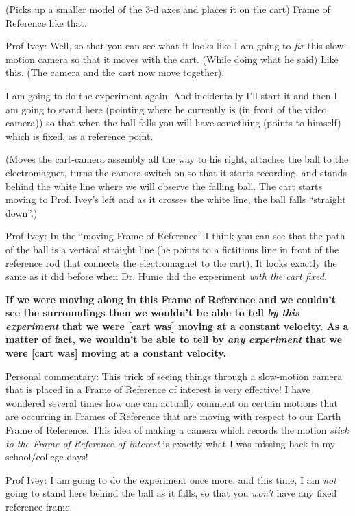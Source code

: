 \documentclass[a6paper]{article}
\begin{document}
(Picks up a smaller model of the 3-d axes and places it on the cart) Frame of Reference like that. 

Prof Ivey: Well, so that you can see what it looks like I am going to \emph{fix} this slow-motion camera so that it moves with the cart. (While doing what he said) Like this. (The camera and the cart now move together).

I am going to do the experiment again. And incidentally I'll start it and then I am going to stand here (pointing where he currently is (in front of the video camera)) so that when the ball falls you will have something (points to himself) which is fixed, as a reference point. 

(Moves the cart-camera assembly all the way to his right, attaches the ball to the electromagnet, turns the camera switch on so that it starts recording, and stands behind the white line where we will observe the falling ball. The cart starts moving to Prof. Ivey's left and as it crosses the white line, the ball falls ``straight down''.)

Prof Ivey: In the ``moving Frame of Reference'' I think you can see that the path of the ball is a vertical straight line (he points to a fictitious line in front of the reference rod that connects the electromagnet to the cart). It looks exactly the same as it did before when Dr. Hume did the experiment \emph{with the cart fixed}.

\textbf{If we were moving along in this Frame of Reference and we couldn't see the surroundings then we wouldn't be able to tell \emph{by this experiment} that we were [cart was] moving at a constant velocity. As a matter of fact, we wouldn't be able to tell by \emph{any experiment} that we were [cart was] moving at a constant velocity.}

Personal commentary: This trick of seeing things through a slow-motion camera that is placed in a Frame of Reference of interest is very effective! I have wondered several times how one can actually comment on certain motions that are occurring in Frames of Reference that are moving with respect to our Earth Frame of Reference. This idea of making a camera which records the motion \emph{stick to the Frame of Reference of interest} is exactly what I was missing back in my school/college days!

Prof Ivey: I am going to do the experiment once more, and this time, I am \emph{not} going to stand here behind the ball as it falls, so that you \emph{won't} have any fixed reference frame.
\end{document}
